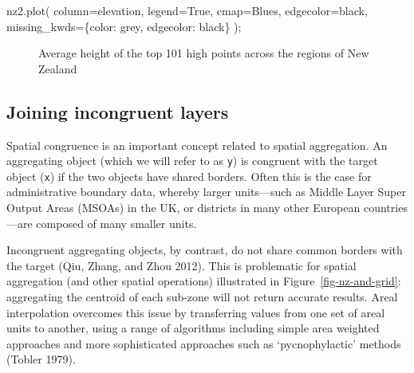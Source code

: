 \documentclass[
  letterpaper,
]{krantz}
\newenvironment{Shaded}{\begin{snugshade}}{\end{snugshade}}
\newcommand{\NormalTok}[1]{\textcolor[rgb]{0.00,0.23,0.31}{#1}}
\newcommand{\OperatorTok}[1]{\textcolor[rgb]{0.37,0.37,0.37}{#1}}
\newcommand{\StringTok}[1]{\textcolor[rgb]{0.13,0.47,0.30}{#1}}
\newcommand{\VariableTok}[1]{\textcolor[rgb]{0.07,0.07,0.07}{#1}}
\begin{document}
\begin{Shaded}
\begin{Highlighting}[]
\NormalTok{nz2.plot(}
\NormalTok{  column}\OperatorTok{=}\StringTok{\textquotesingle{}elevation\textquotesingle{}}\NormalTok{, }
\NormalTok{  legend}\OperatorTok{=}\VariableTok{True}\NormalTok{,}
\NormalTok{  cmap}\OperatorTok{=}\StringTok{\textquotesingle{}Blues\textquotesingle{}}\NormalTok{, edgecolor}\OperatorTok{=}\StringTok{\textquotesingle{}black\textquotesingle{}}\NormalTok{,}
\NormalTok{  missing\_kwds}\OperatorTok{=}\NormalTok{\{}\StringTok{\textquotesingle{}color\textquotesingle{}}\NormalTok{: }\StringTok{\textquotesingle{}grey\textquotesingle{}}\NormalTok{, }\StringTok{\textquotesingle{}edgecolor\textquotesingle{}}\NormalTok{: }\StringTok{\textquotesingle{}black\textquotesingle{}}\NormalTok{\}}
\NormalTok{)}\OperatorTok{;}
\end{Highlighting}
\end{Shaded}

\begin{figure}[H]


\caption{\label{fig-nz-avg-nz-height}Average height of the top 101 high
points across the regions of New Zealand}

\end{figure}%

\subsection{Joining incongruent
layers}\label{sec-joining-incongruent-layers}

Spatial congruence is an important concept related to spatial
aggregation. An aggregating object (which we will refer to as
\texttt{y}) is congruent with the target object (\texttt{x}) if the two
objects have shared borders. Often this is the case for administrative
boundary data, whereby larger units---such as Middle Layer Super Output
Areas (MSOAs) in the UK, or districts in many other European
countries---are composed of many smaller units.

Incongruent aggregating objects, by contrast, do not share common
borders with the target (Qiu, Zhang, and Zhou 2012). This is problematic
for spatial aggregation (and other spatial operations) illustrated in
Figure~\ref{fig-nz-and-grid}: aggregating the centroid of each sub-zone
will not return accurate results. Areal interpolation overcomes this
issue by transferring values from one set of areal units to another,
using a range of algorithms including simple area weighted approaches
and more sophisticated approaches such as `pycnophylactic' methods
(Tobler 1979).
\end{document}
